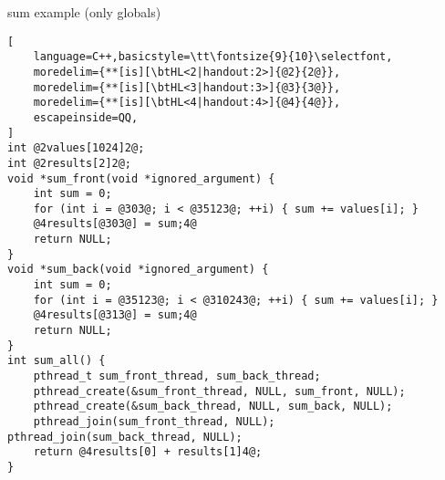 \begin{frame}[fragile,label=sumToGlobal]{sum example (only globals)}
\begin{lstlisting}[
    language=C++,basicstyle=\tt\fontsize{9}{10}\selectfont,
    moredelim={**[is][\btHL<2|handout:2>]{@2}{2@}},
    moredelim={**[is][\btHL<3|handout:3>]{@3}{3@}},
    moredelim={**[is][\btHL<4|handout:4>]{@4}{4@}},
    escapeinside=QQ,
]
int @2values[1024]2@;
int @2results[2]2@;
void *sum_front(void *ignored_argument) {
    int sum = 0;
    for (int i = @303@; i < @35123@; ++i) { sum += values[i]; }
    @4results[@303@] = sum;4@
    return NULL;
}
void *sum_back(void *ignored_argument) {
    int sum = 0;
    for (int i = @35123@; i < @310243@; ++i) { sum += values[i]; }
    @4results[@313@] = sum;4@
    return NULL;
}
int sum_all() {
    pthread_t sum_front_thread, sum_back_thread;
    pthread_create(&sum_front_thread, NULL, sum_front, NULL);
    pthread_create(&sum_back_thread, NULL, sum_back, NULL);
    pthread_join(sum_front_thread, NULL); pthread_join(sum_back_thread, NULL);
    return @4results[0] + results[1]4@;
}
\end{lstlisting}
\end{frame}

